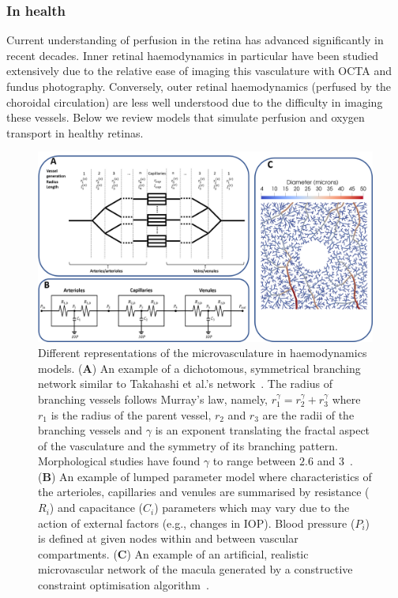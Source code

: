 \documentclass{article}
\begin{document}
\subsubsection{In health}

Current understanding of perfusion in the retina has advanced significantly in recent decades.
Inner retinal haemodynamics in particular have been studied extensively due to the relative ease of imaging this vasculature with OCTA and fundus photography.
Conversely, outer retinal haemodynamics (perfused by the choroidal circulation) are less well understood due to the difficulty in imaging these vessels.
Below we review models that simulate perfusion and oxygen transport in healthy retinas.

\begin{figure}[t!]
  \centering
  \includegraphics[width=\textwidth]{NetworkModels}
  \caption{Different representations of the microvasculature in haemodynamics models. (\textbf A) An example of a dichotomous, symmetrical branching network similar to Takahashi et al.'s network~\cite{Takahashi_2009}. The radius of branching vessels follows Murray's law, namely, $r_1^\gamma = r_2^\gamma+r_3^\gamma$ where $r_1$ is the radius of the parent vessel, $r_2$ and $r_3$ are the radii of the branching vessels and $\gamma$ is an exponent translating the fractal aspect of the vasculature and the symmetry of its branching pattern. Morphological studies have found $\gamma$ to range between $2.6$ and $3$~\cite{Ma_2021, Takahashi_2009}. (\textbf{B}) An example of lumped parameter model where characteristics of the arterioles, capillaries and venules are summarised by resistance ($R_i$) and capacitance ($C_i$) parameters which may vary due to the action of external factors (e.g., changes in IOP). Blood pressure ($P_i$) is defined at given nodes within and between vascular compartments. (\textbf{C}) An example of an artificial, realistic microvascular network of the macula generated by a constructive constraint optimisation algorithm~\cite{Talou_2021}.}
  \label{fig:NetworkModels}
\end{figure}
\end{document}
